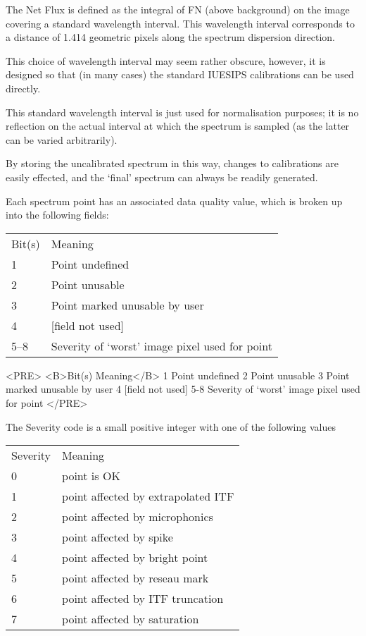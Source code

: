 The Net Flux is defined as the integral of FN (above background) on the image
covering a standard wavelength interval.  This wavelength interval corresponds
to a distance of 1.414 geometric pixels along the spectrum dispersion
direction.

This choice of wavelength interval may seem rather obscure, however, it
is designed so that (in many cases) the standard IUESIPS calibrations can be
used directly.

This standard wavelength interval is just used for normalisation purposes; it
is no reflection on the actual interval at which the spectrum is sampled (as
the latter can be varied arbitrarily)\@.

By storing the uncalibrated spectrum in this way, changes to calibrations
are easily effected, and the `final' spectrum can always be readily generated.

Each spectrum point has an associated data quality value, which is broken up
into the following fields:

\begin{latexonly}
\begin{tabular}{ll}
Bit(s) &  Meaning\\
1      &  Point undefined\\
2      &  Point unusable\\
3      &  Point marked unusable by user\\
4      &  [field not used]\\
5--8   &  Severity of `worst' image pixel used for point\\
\end{tabular}
\end{latexonly}

\begin{htmlonly}
\begin{rawhtml}
<PRE>
<B>Bit(s)   Meaning</B>
  1      Point undefined
  2      Point unusable
  3      Point marked unusable by user
  4      [field not used]
 5-8     Severity of `worst' image pixel used for point
</PRE>
\end{rawhtml}
\end{htmlonly}

The Severity code is a small positive integer with one of the
following values

\begin{latexonly}
\begin{tabular}{ll}
Severity & Meaning\\
0        & point is OK\\
1        & point affected by extrapolated ITF\\
2        & point affected by microphonics\\
3        & point affected by spike\\
4        & point affected by bright point\\
5        & point affected by reseau mark\\
6        & point affected by ITF truncation\\
7        & point affected by saturation\\
\end{tabular}
\end{latexonly}

